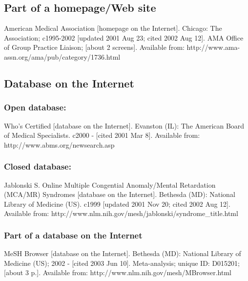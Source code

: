 \documentclass[a4paper,10pt]{article}
\begin{document}
\subsection{Part of a homepage/Web site}

American Medical Association [homepage on the Internet]. Chicago: The Association; c1995-2002 [updated 2001 Aug 23; cited 2002 Aug 12]. AMA Office of Group Practice Liaison; [about 2 screens]. Available from: http://www.ama-assn.org/ama/pub/category/1736.html\cite{american}

\subsection{Database on the Internet}

\subsubsection{Open database:}
Who's Certified [database on the Internet]. Evanston (IL): The American Board of Medical Specialists. c2000 - [cited 2001 Mar 8]. Available from: http://www.abms.org/newsearch.asp\cite{whos}

\subsubsection{Closed database:}
Jablonski S. Online Multiple Congential Anomaly/Mental Retardation (MCA/MR) Syndromes [database on the Internet]. Bethesda (MD): National Library of Medicine (US). c1999 [updated 2001 Nov 20; cited 2002 Aug 12]. Available from: http://www.nlm.nih.gov/mesh/jablonski/syndrome\_title.html\cite{jablonski:online}

\subsubsection{Part of a database on the Internet}
MeSH Browser [database on the Internet]. Bethesda (MD): National Library of Medicine (US); 2002 - [cited 2003 Jun 10]. Meta-analysis; unique ID: D015201; [about 3 p.]. Available from: http://www.nlm.nih.gov/mesh/MBrowser.html\cite{mesh}


\end{document}
